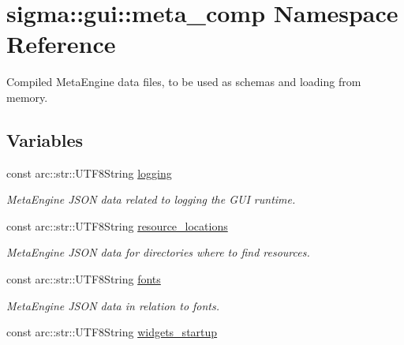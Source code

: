 \hypertarget{namespacesigma_1_1gui_1_1meta__comp}{}\section{sigma\+:\+:gui\+:\+:meta\+\_\+comp Namespace Reference}
\label{namespacesigma_1_1gui_1_1meta__comp}


Compiled Meta\+Engine data files, to be used as schema\textquotesingle{}s and loading from memory.  


\subsection*{Variables}
\begin{DoxyCompactItemize}
\item 
\hypertarget{namespacesigma_1_1gui_1_1meta__comp_a9d830b72a14e4195dec0dacf0808fd94}{}const arc\+::str\+::\+U\+T\+F8\+String \hyperlink{namespacesigma_1_1gui_1_1meta__comp_a9d830b72a14e4195dec0dacf0808fd94}{logging}\label{namespacesigma_1_1gui_1_1meta__comp_a9d830b72a14e4195dec0dacf0808fd94}

\begin{DoxyCompactList}\small\item\em Meta\+Engine J\+S\+O\+N data related to logging the G\+U\+I runtime. \end{DoxyCompactList}\item 
\hypertarget{namespacesigma_1_1gui_1_1meta__comp_a8c33d88d36657b5ada3966bbb157ff3d}{}const arc\+::str\+::\+U\+T\+F8\+String \hyperlink{namespacesigma_1_1gui_1_1meta__comp_a8c33d88d36657b5ada3966bbb157ff3d}{resource\+\_\+locations}\label{namespacesigma_1_1gui_1_1meta__comp_a8c33d88d36657b5ada3966bbb157ff3d}

\begin{DoxyCompactList}\small\item\em Meta\+Engine J\+S\+O\+N data for directories where to find resources. \end{DoxyCompactList}\item 
\hypertarget{namespacesigma_1_1gui_1_1meta__comp_a5d2a7fc67952b94831e43c67d8072a2e}{}const arc\+::str\+::\+U\+T\+F8\+String \hyperlink{namespacesigma_1_1gui_1_1meta__comp_a5d2a7fc67952b94831e43c67d8072a2e}{fonts}\label{namespacesigma_1_1gui_1_1meta__comp_a5d2a7fc67952b94831e43c67d8072a2e}

\begin{DoxyCompactList}\small\item\em Meta\+Engine J\+S\+O\+N data in relation to fonts. \end{DoxyCompactList}\item 
\hypertarget{namespacesigma_1_1gui_1_1meta__comp_a1d728f394b3b6020a1633406a5191801}{}const arc\+::str\+::\+U\+T\+F8\+String \hyperlink{namespacesigma_1_1gui_1_1meta__comp_a1d728f394b3b6020a1633406a5191801}{widgets\+\_\+startup}\label{namespacesigma_1_1gui_1_1meta__comp_a1d728f394b3b6020a1633406a5191801}


\end{DoxyCompactItemize}
